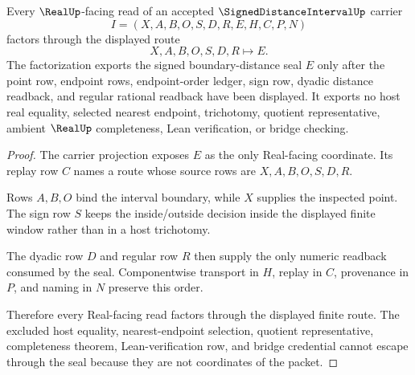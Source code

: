 \begin{theorem}
\label{thm:signed-distance-interval-real-seal-nonescape}
Every $\RealUp$-facing read of an accepted $\SignedDistanceIntervalUp$ carrier
$$
I=(X,A,B,O,S,D,R,E,H,C,P,N)
$$
factors through the displayed route
$$
X,A,B,O,S,D,R \longmapsto E .
$$
The factorization exports the signed boundary-distance seal $E$ only after the point row, endpoint rows, endpoint-order ledger, sign row, dyadic distance readback, and regular rational readback have been displayed. It exports no host real equality, selected nearest endpoint, trichotomy, quotient representative, ambient $\RealUp$ completeness, Lean verification, or bridge checking.
\end{theorem}
\begin{proof}
The carrier projection exposes $E$ as the only Real-facing coordinate. Its replay row $C$ names a route whose source rows are $X,A,B,O,S,D,R$.

Rows $A,B,O$ bind the interval boundary, while $X$ supplies the inspected point. The sign row $S$ keeps the inside/outside decision inside the displayed finite window rather than in a host trichotomy.

The dyadic row $D$ and regular row $R$ then supply the only numeric readback consumed by the seal. Componentwise transport in $H$, replay in $C$, provenance in $P$, and naming in $N$ preserve this order.

Therefore every Real-facing read factors through the displayed finite route. The excluded host equality, nearest-endpoint selection, quotient representative, completeness theorem, Lean-verification row, and bridge credential cannot escape through the seal because they are not coordinates of the packet.
\end{proof}


\begin{closurestatus}{\SignedDistanceIntervalUp}
  \theoryclosure{\seedClosure}
  \formalstatus{\unformalizedV}
\end{closurestatus}
